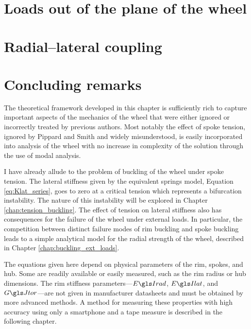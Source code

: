 \documentclass[\rootdir/thesis.tex]{subfiles}
\begin{document}
\section{Loads out of the plane of the wheel}
\label{sec:Lateral}


\section{Radial--lateral coupling}
\label{sec:coupling}



\section{Concluding remarks}

The theoretical framework developed in this chapter is sufficiently rich to capture important aspects of the mechanics of the wheel that were either ignored or incorrectly treated by previous authors. Most notably the effect of spoke tension, ignored by Pippard and Smith and widely misunderstood, is easily incorporated into analysis of the wheel with no increase in complexity of the solution through the use of modal analysis.

I have already allude to the problem of buckling of the wheel under spoke tension. The lateral stiffness given by the equivalent springs model, Equation \ref{eq:Klat_series}, goes to zero at a critical tension which represents a bifurcation instability. The nature of this instability will be explored in Chapter \ref{chap:tension_buckling}. The effect of tension on lateral stiffness also has consequences for the failure of the wheel under external loads. In particular, the competition between distinct failure modes of rim buckling and spoke buckling leads to a simple analytical model for the radial strength of the wheel, described in Chapter \ref{chap:buckling_ext_loads}.

The equations given here depend on physical parameters of the rim, spokes, and hub. Some are readily available or easily measured, such as the rim radius or hub dimensions. The rim stiffness parameters---$\EIr$, $\EIl$, and $\GJ$---are not given in manufacturer datasheets and must be obtained by more advanced methods. A method for measuring these properties with high accuracy using only a smartphone and a tape measure is described in the following chapter.
\end{document}
